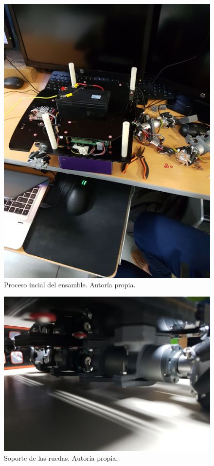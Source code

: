 \begin{figure}[H]
\includegraphics[scale=0.3]{imagenes/ensamble0.jpg}
\caption{Proceso incial del ensamble. Autoría propia.}
\label{F:ensamble1}
\end{figure}

\begin{figure}[H]
\centering
\includegraphics[scale=0.35]{imagenes/ensamble3.jpg}
\caption{Soporte de las ruedas. Autoría propia.}
\label{F:ensamble2}
\end{figure}

